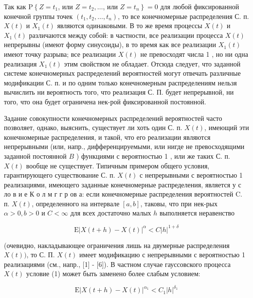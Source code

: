\documentclass[10pt]{article}
\begin{document}
Так как $\mathrm{P}\left\{Z=t_{1}\right.$, или $Z=t_{2}, \ldots$, или $\left.Z=t_{n}\right\}=0$ для любой фиксированной конечной группы точек $\left(t_{1}, t_{2}, \ldots, t_{n}\right)$, то все конечномерные распределения С. п. $X(t)$ и $X_{1}(t)$ являются одинаковыми. В то же время процессы $X(t)$ и $X_{1}(t)$ различаются между собой: в частности, все реализации процесса $X(t)$ непрерывны (имеют форму синусоиды), в то время как все реализации $X_{1}(t)$ имеют точку разрыва; все реализации $X(t)$ не превосходят числа 1 , но ни одна реализация $X_{1}(t)$ этим свойством не обладает. Отсюда следует, что заданной системе конечномерных распределений вероятностей могут отвечать различные модификации С. п. и по одним только конечномерным распределениям нельзя вычислить ни вероятность того, что реализация С. П. будет непрерывной, ни того, что она будет ограничена нек-рой фиксированной постоянной.



Задание совокупности конечномерных распределений вероятностей часто позволяет, однако, выяснить, существует ли хоть один С. п. $X(t)$, имеющий эти конечномерные распределения, и такой, что его реализации являются непрерывными (или, напр., дифференцируемыми, или нигде не превосходящими заданной постоянной $B$ ) функциями с вероятностью 1 , или же таких С. п. $X(t)$ вообще не существует. Типичным примером общего условия, гарантирующего существование С. п. $X(t)$ с непрерывными с вероятностью 1 реализациями, имеющего заданные конечномерные распределения, является у с ло в и е К о л м г г р ов а: если конечномерные распределения вероятностей C. п. $X(t)$, определенного на интервале $[a, b]$, таковы, что при нек-рых $\alpha>0, b>0$ и $C<\infty$ для всех достаточно малых $h$ выполняется неравенство



\[

\mathrm{E}|X(t+h)-X(t)|^{\alpha}<C|h|^{1+\delta}

\]



(очевидно, накладывающее ограничения лишь на двумерные распределения $X(t))$, то С. П. $X(t)$ имеет модификацию с непрерывными с вероятностью 1 реализациями (см., напр., [1] - [6]). В частном случае гауссовского процесса $X(t)$ условие (1) может быть заменено более слабым условием:



\[

\mathrm{E}|X(t+h)-X(t)|^{\alpha_{1}}<C_{1}|h|^{\delta_{1}}

\]
\end{document}
